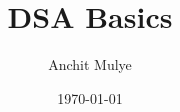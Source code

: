 \newpage
\thispagestyle{empty} %
\title{DSA Basics}
\author{Anchit Mulye}
\date{\today}
\maketitle

\tableofcontents
\newpage